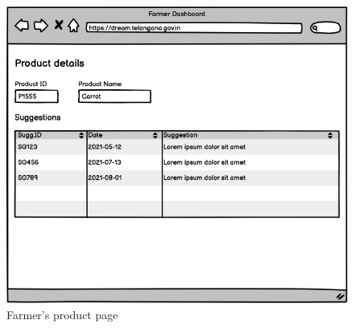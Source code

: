 \documentclass[10pt]{article} %
\begin{document}
\begin{figure}[h]
    \centering
    \includegraphics[scale=0.4]{images/uimockups/f_product.png}
    \caption{Farmer's product page}
    \label{fig:ui_f_product}
\end{figure}
\end{document}
